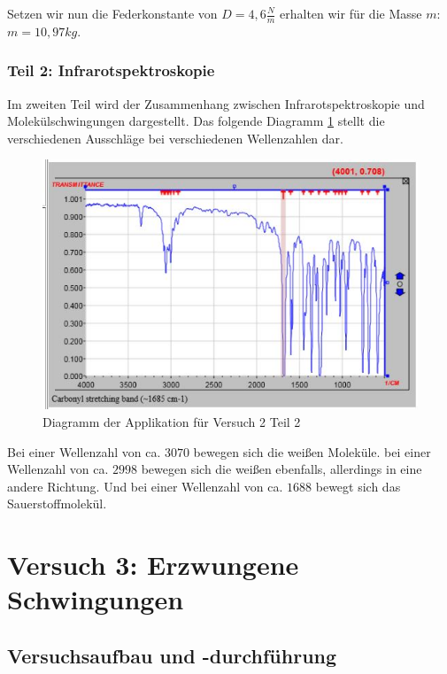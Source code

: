             Setzen wir nun die Federkonstante von $D = 4,6\frac{N}{m}$ erhalten wir für die Masse $m$: $m =  10,97 kg$.
            
        \subsubsection{Teil 2: Infrarotspektroskopie}
        
            Im zweiten Teil wird der Zusammenhang zwischen Infrarotspektroskopie und Molekülschwingungen dargestellt. Das folgende Diagramm \ref{fig:diagram_v2} stellt die verschiedenen Ausschläge bei verschiedenen Wellenzahlen dar.

            \begin{figure}[H]
                \centering
                \includegraphics[width=\textwidth]{bilder/diagram_v2.jpg}
                \caption{Diagramm der Applikation für Versuch 2 Teil 2}
                \label{fig:diagram_v2}
            \end{figure}

            Bei einer Wellenzahl von ca. $3070$ bewegen sich die weißen Moleküle. bei einer Wellenzahl von ca. $2998$ bewegen sich die weißen ebenfalls, allerdings in eine andere Richtung. Und bei einer Wellenzahl von ca. $1688$ bewegt sich das Sauerstoffmolekül.

\newpage

\section{Versuch 3: Erzwungene Schwingungen}

    \subsection{Versuchsaufbau und -durchführung}
            
